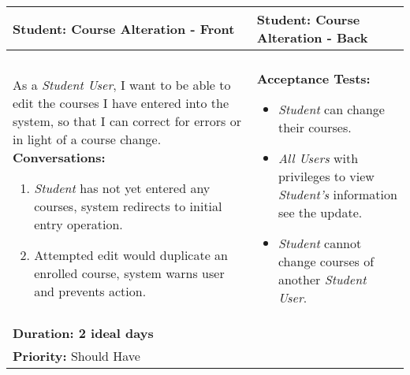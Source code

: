 \documentclass[11pt]{article}
\begin{document}
\begin{center}
\begin{tabular}{ | m{8cm}  |  m{8cm}  | } 
 \hline
 \textbf{Student: Course Alteration - Front} &  \textbf{Student: Course Alteration - Back}  \\ 
  \hline
&\\[5pt]
As a \emph{Student User}, I want to be able to edit the courses I have entered into the system, so that I can correct for errors or in light of a course change.  
\newline
\textbf{Conversations:}
\begin{enumerate}
\item{\emph{Student} has not yet entered any courses, system redirects to initial entry operation.}
\item{Attempted edit would duplicate an enrolled course, system warns user and prevents action.}
\end{enumerate}
& \textbf{Acceptance Tests:} 
\begin{itemize}
\item{\emph{Student} can change their courses.}
\item{\emph{All Users} with privileges to view \emph{Student's} information see the update.}
\item{\emph{Student} cannot change courses of another \emph{Student User}.}
\end{itemize} \\
\textbf{Duration: 2 ideal days} &\\
\textbf{Priority:}  \textcolor{mauve}{Should Have} & \\
 \hline
\end{tabular}
\end{center}
\end{document}
